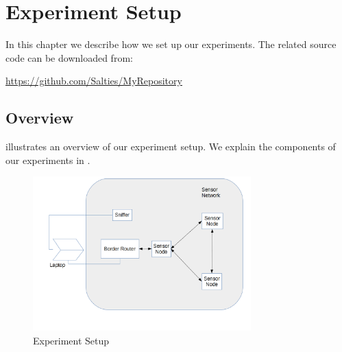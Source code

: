 \chapter{Experiment Setup} \label{Chp: Setup}

In this chapter we describe how we set up our experiments. The related source code can be downloaded from:\\
\begin{center}
	\url{https://github.com/Salties/MyRepository}
\end{center}

\section{Overview}

 illustrates an overview of our experiment setup. We explain the components of our experiments in .

\begin{figure}[h!]
	\center
	\includegraphics[width=0.75\textwidth,]{fig/setup.png}
	\caption{Experiment Setup} \label{Fig: Experiment Setup}
\end{figure}

